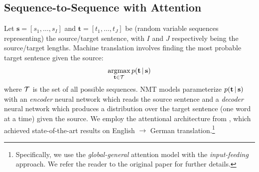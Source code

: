 \documentclass[11pt,letterpaper]{article}
\DeclareMathOperator*{\argmax}{argmax}
\DeclareMathOperator{\lstm}{LSTM}
\begin{document}
\subsection{Sequence-to-Sequence with Attention}\label{NMT}
Let $\mathbf{s} = [s_1, \dots, s_I]$ and $\mathbf{t} = [t_1, \dots, t_J]$ be 
 (random variable sequences representing) the source/target sentence, 
with $I$ and $J$ respectively being the source/target lengths. Machine translation
involves finding the most probable target sentence given the source: 
\begin{equation*}
\argmax_{\tvec \in \mcT} p(\tvec \given \svec)
\end{equation*}
where $\mathcal{T}$ is the set of all possible sequences.
NMT models parameterize $p(\mathbf{t}\,|\,\mathbf{s})$ 
with an \textit{encoder} neural network which reads the source sentence and a \textit{decoder}
neural network which produces a distribution over the target sentence (one word at a time) given the source. 
We employ the attentional architecture from 
, which achieved state-of-the-art results on English $\rightarrow$
German translation.\footnote{Specifically, we use the \textit{global-general} attention model
with the \textit{input-feeding} approach. We refer the reader to the original paper for further details.}

\end{document}

